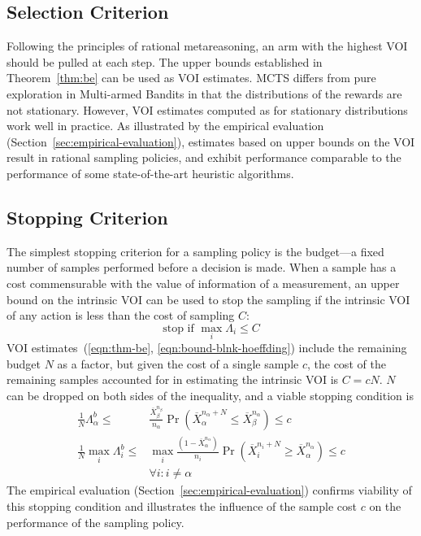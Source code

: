 \documentclass[]{article}
\begin{document}
\subsection{Selection Criterion}

Following the principles of rational metareasoning, an arm with the
highest VOI should be pulled at each step. The upper bounds
established in Theorem~\ref{thm:be} can be used as VOI estimates. MCTS
differs from pure exploration in Multi-armed Bandits in that the
distributions of the rewards are not stationary. However, VOI
estimates computed as for stationary distributions work well in
practice. As illustrated
by the empirical evaluation (Section~\ref{sec:empirical-evaluation}),
estimates based on upper bounds on the VOI result in rational sampling
policies, and exhibit performance comparable to the performance of
some state-of-the-art heuristic algorithms.

\subsection{Stopping Criterion}
\label{sec:control-stopping-criterion}

The simplest stopping criterion for a sampling policy is the
budget---a fixed number of samples performed before a decision is
made. When a sample has a cost commensurable with the value of
information of a measurement, an upper bound on the intrinsic VOI can
be used to stop the sampling if the intrinsic VOI of any action
is less than the cost of sampling $C$:
\begin{equation}
\mbox{stop if } \max_i \Lambda_i \le C
\end{equation}
VOI estimates~(\ref{eqn:thm-be},
\ref{eqn:bound-blnk-hoeffding}) include the remaining budget $N$ as a
factor, but given the cost of a single sample $c$, the cost of the
remaining samples accounted for in estimating the intrinsic VOI is
$C=cN$. $N$ can be dropped on both sides of the inequality,
and a viable stopping condition is
\begin{align}
\frac 1 N \Lambda_\alpha^b \le&\frac {\overline X_\beta^{n_\beta}}
  {n_\alpha}\Pr(\overline X_\alpha^{n_\alpha+N}\le\overline
  X_\beta^{n_\alpha})\le c\nonumber\\
\frac 1 N \max_i\Lambda_i^b\le &\max_i\frac {(1-\overline X_\alpha^{n_\alpha})} {n_i}\Pr(\overline
  X_i^{n_i+N}\ge\overline X_\alpha^{n_\alpha})\le c\nonumber\\
    &\forall i: i\ne\alpha
\label{eqn:stopping-blnk}
\end{align}
The empirical evaluation (Section~\ref{sec:empirical-evaluation})
confirms viability of this stopping condition and illustrates the
influence of the sample cost $c$ on the performance of
the sampling policy.
\end{document}
